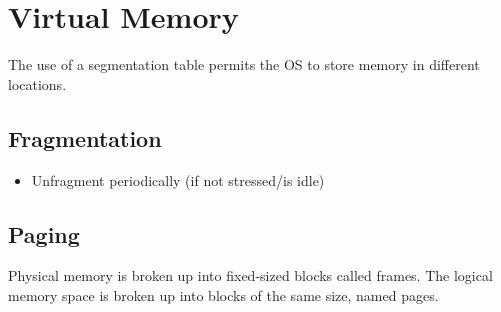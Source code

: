 \documentclass{article}
\begin{document}
\section*{Virtual Memory}
The use of a segmentation table permits the OS to store memory in different
locations.

\subsection*{Fragmentation}

\begin{itemize}
    \item Unfragment periodically (if not stressed/is idle)
\end{itemize}

\subsection*{Paging}
Physical memory is broken up into fixed-sized blocks called frames. The logical
memory space is broken up into blocks of the same size, named pages.
\end{document}
